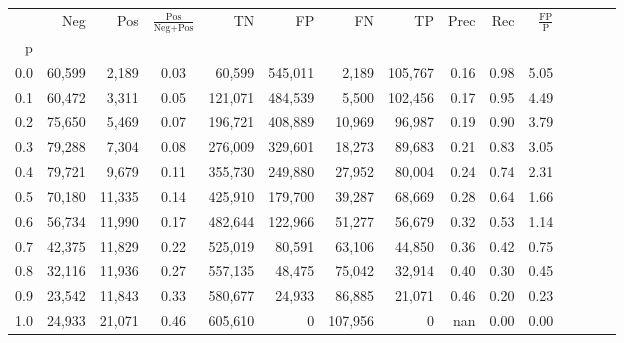 \begin{tabular}{rrrcrrrrrrrrrrr}
\toprule
{} &     Neg &     Pos & $\frac{\text{Pos}}{\text{Neg}+\text{Pos}}$ &       TN &       FP &       FN &       TP &  Prec &   Rec & $\frac{\text{FP}}{\text{P}}$ \\
p   &         &         &                                            &          &          &          &          &       &       &                              \\
\midrule
0.0 &  60,599 &   2,189 &                                       0.03 &   60,599 &  545,011 &    2,189 &  105,767 &  0.16 &  0.98 &                         5.05 \\
0.1 &  60,472 &   3,311 &                                       0.05 &  121,071 &  484,539 &    5,500 &  102,456 &  0.17 &  0.95 &                         4.49 \\
0.2 &  75,650 &   5,469 &                                       0.07 &  196,721 &  408,889 &   10,969 &   96,987 &  0.19 &  0.90 &                         3.79 \\
0.3 &  79,288 &   7,304 &                                       0.08 &  276,009 &  329,601 &   18,273 &   89,683 &  0.21 &  0.83 &                         3.05 \\
0.4 &  79,721 &   9,679 &                                       0.11 &  355,730 &  249,880 &   27,952 &   80,004 &  0.24 &  0.74 &                         2.31 \\
0.5 &  70,180 &  11,335 &                                       0.14 &  425,910 &  179,700 &   39,287 &   68,669 &  0.28 &  0.64 &                         1.66 \\
0.6 &  56,734 &  11,990 &                                       0.17 &  482,644 &  122,966 &   51,277 &   56,679 &  0.32 &  0.53 &                         1.14 \\
0.7 &  42,375 &  11,829 &                                       0.22 &  525,019 &   80,591 &   63,106 &   44,850 &  0.36 &  0.42 &                         0.75 \\
0.8 &  32,116 &  11,936 &                                       0.27 &  557,135 &   48,475 &   75,042 &   32,914 &  0.40 &  0.30 &                         0.45 \\
0.9 &  23,542 &  11,843 &                                       0.33 &  580,677 &   24,933 &   86,885 &   21,071 &  0.46 &  0.20 &                         0.23 \\
1.0 &  24,933 &  21,071 &                                       0.46 &  605,610 &        0 &  107,956 &        0 &   nan &  0.00 &                         0.00 \\
\bottomrule
\end{tabular}
